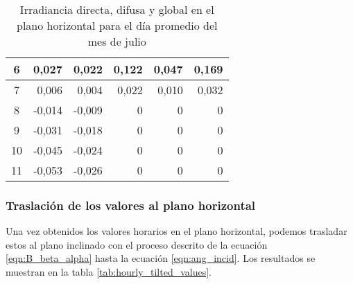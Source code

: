 \begin{table}[ht]
\begin{tabular}{|c|r|r|r|r|r|}
6   & 0,027  & 0,022  & 0,122 & 0,047 & 0,169 \\ \hline
7   & 0,006  & 0,004  & 0,022 & 0,010 & 0,032 \\ \hline
8   & -0,014 & -0,009 & 0     & 0     & 0     \\ \hline
9   & -0,031 & -0,018 & 0     & 0     & 0     \\ \hline
10  & -0,045 & -0,024 & 0     & 0     & 0     \\ \hline
11  & -0,053 & -0,026 & 0     & 0     & 0     \\ \hline
\end{tabular}
\caption{Irradiancia directa, difusa y global en el plano horizontal para el día promedio del mes de julio \label{tab:hourly_horizontal_values}}
\end{table}

\subsubsection{Traslación de los valores al plano horizontal}

Una vez obtenidos los valores horarios en el plano horizontal, podemos trasladar estos al plano inclinado con el proceso descrito de la ecuación \ref{eqn:B_beta_alpha} hasta la ecuación \ref{eqn:ang_incid}. Los resultados se muestran en la tabla \ref{tab:hourly_tilted_values}.

